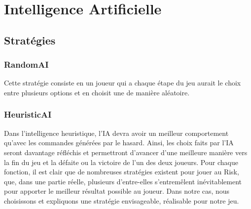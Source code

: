 \section{Intelligence Artificielle}

\subsection{Stratégies}

\subsubsection{RandomAI}
Cette stratégie consiste en un joueur qui a chaque étape du jeu aurait le choix entre plusieurs options et en choisit une de manière aléatoire.

\subsubsection{HeuristicAI}
Dans l'intelligence heuristique, l'IA devra avoir un meilleur comportement qu'avec les commandes générées par le hasard. Ainsi, les choix faits par l'IA seront davantage réfléchis et permettront d'avancer d'une meilleure manière vers la fin du jeu et la défaite ou la victoire de l'un des deux joueurs. 
Pour chaque fonction, il est clair que de nombreuses stratégies existent pour jouer au Risk, que, dans une partie réelle, plusieurs d'entre-elles s'entremêlent inévitablement pour apporter le meilleur résultat possible au joueur. Dans notre cas, nous choisissons et expliquons une stratégie envisageable, réalisable pour notre jeu.
\newline

